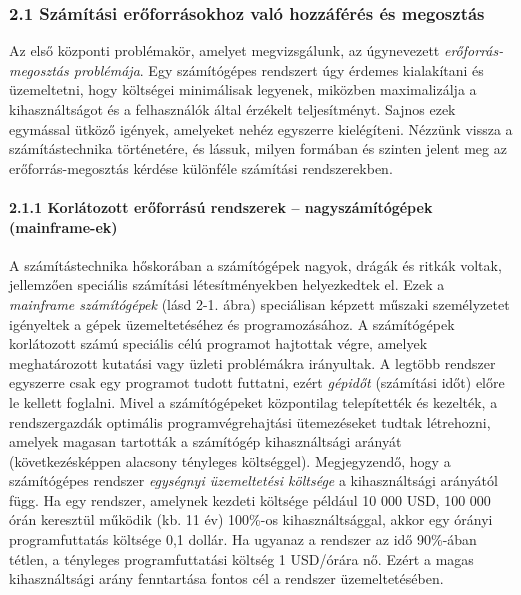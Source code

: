 \documentclass[
]{article}
\begin{document}
\hypertarget{szuxe1muxedtuxe1si-erux151forruxe1sokhoz-valuxf3-hozzuxe1fuxe9ruxe9s-uxe9s-megosztuxe1s}{%
\subsubsection{2.1 Számítási erőforrásokhoz való hozzáférés és
megosztás}\label{szuxe1muxedtuxe1si-erux151forruxe1sokhoz-valuxf3-hozzuxe1fuxe9ruxe9s-uxe9s-megosztuxe1s}}

Az első központi problémakör, amelyet megvizsgálunk, az úgynevezett
\emph{erőforrás-megosztás problémája}. Egy számítógépes rendszert úgy
érdemes kialakítani és üzemeltetni, hogy költségei minimálisak legyenek,
miközben maximalizálja a kihasználtságot és a felhasználók által
érzékelt teljesítményt. Sajnos ezek egymással ütköző igények, amelyeket
nehéz egyszerre kielégíteni. Nézzünk vissza a számítástechnika
történetére, és lássuk, milyen formában és szinten jelent meg az
erőforrás-megosztás kérdése különféle számítási rendszerekben.

\hypertarget{korluxe1tozott-erux151forruxe1suxfa-rendszerek-nagyszuxe1muxedtuxf3guxe9pek-mainframe-ek}{%
\paragraph{2.1.1 Korlátozott erőforrású rendszerek -- nagyszámítógépek
(mainframe-ek)}\label{korluxe1tozott-erux151forruxe1suxfa-rendszerek-nagyszuxe1muxedtuxf3guxe9pek-mainframe-ek}}

A számítástechnika hőskorában a számítógépek nagyok, drágák és ritkák
voltak, jellemzően speciális számítási létesítményekben helyezkedtek el.
Ezek a \emph{mainframe számítógépek} (lásd 2-1. ábra) speciálisan
képzett műszaki személyzetet igényeltek a gépek üzemeltetéséhez és
programozásához. A számítógépek korlátozott számú speciális célú
programot hajtottak végre, amelyek meghatározott kutatási vagy üzleti
problémákra irányultak. A legtöbb rendszer egyszerre csak egy programot
tudott futtatni, ezért \emph{gépidőt} (számítási időt) előre le kellett
foglalni. Mivel a számítógépeket központilag telepítették és kezelték, a
rendszergazdák optimális programvégrehajtási ütemezéseket tudtak
létrehozni, amelyek magasan tartották a számítógép kihasználtsági
arányát (következésképpen alacsony tényleges költséggel). Megjegyzendő,
hogy a számítógépes rendszer \emph{egységnyi üzemeltetési költsége} a
kihasználtsági arányától függ. Ha egy rendszer, amelynek kezdeti
költsége például 10 000 USD, 100 000 órán keresztül működik (kb. 11 év)
100\%-os kihasználtsággal, akkor egy órányi programfuttatás költsége 0,1
dollár. Ha ugyanaz a rendszer az idő 90\%-ában tétlen, a tényleges
programfuttatási költség 1 USD/órára nő. Ezért a magas kihasználtsági
arány fenntartása fontos cél a rendszer üzemeltetésében.
\end{document}
